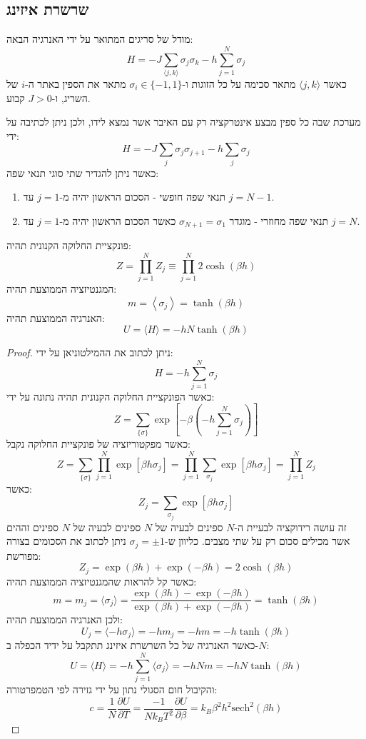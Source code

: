 \documentclass{tstextbook}
\begin{document}
\subsection{שרשרת איזינג}

\begin{reminder}
מודל של סריגים המתואר על ידי האנרגיה הבאה:
$$H=-J\sum_{\langle j,k\rangle}\sigma_{j}\sigma_{k}-h\sum_{j=1}^{N}\sigma_{j}$$
כאשר \(\langle j,k \rangle\) מתאר סכימה על כל הזוגות ו-\(\sigma_{i}\in\{ -1,1 \}\) מתאר את הספין באתר ה-\(i\) של השריג, ו-\(J>0\) קבוע.

\end{reminder}
\begin{definition}
מערכת שבה כל ספין מבצע אינטרקציה רק עם האיבר אשר נמצא לידו, ולכן ניתן לכתיבה על ידי:
$$H=-J\sum_{j}\sigma_{j}\sigma_{j+1}-h\sum_{j}\sigma_{j}$$
כאשר ניתן להגדיר שתי סוגי תנאי שפה:

  \begin{enumerate}
    \item תנאי שפה חופשי - הסכום הראשון יהיה מ-\(j=1\) עד \(j=N-1\). 


    \item תנאי שפה מחוזרי - מוגדר \(\sigma_{N+1}=\sigma_{1}\) כאשר הסכום הראשון יהיה מ-\(j=1\) עד \(j=N\). 


  \end{enumerate}
\end{definition}
\begin{proposition}[שרשרת איזינג כאשר \(J=0\)]
פונקציית החלוקה הקנונית תהיה:
$$Z=\prod_{j=1}^{N} Z_{j}\equiv \prod_{j=1}^{N}2\cosh\left( \beta h \right)$$
המגנטיזציה הממוצעת תהיה:
$$m=\left\langle  \sigma_{j}  \right\rangle =\tanh\left( \beta h \right)$$
האנרגיה הממוצעת תהיה:
$$U=\langle H\rangle=-h N\operatorname{tanh}(\beta h)$$

\end{proposition}
\begin{proof}
ניתן לכתוב את ההמילטוניאן על ידי:
$$H=-h\sum_{j=1}^{N}\sigma_{j}$$
כאשר הפונקציית החלוקה הקנונית תהיה נתונה על ידי:
$$Z=\sum_{\{\sigma\}}\exp[-\beta(-h\sum_{j=1}^{N}\sigma_{j})]$$
כאשר מפקטוריזציה של פונקציית החלוקה נקבל:
$$Z=\sum_{\{\sigma\}}\prod_{j=1}^{N}\exp[\beta h\sigma_{j}]=\prod_{j=1}^{N}\sum_{\sigma_{j}}\exp[\beta h\sigma_{j}]=\prod_{j=1}^{N}Z_{j}$$
כאשר:
$$Z_{j}=\sum_{\sigma_{j}}\exp[\beta h\sigma_{j}]$$
זה עושה רידוקציה לבעיית ה-\(N\) ספינים לבעיה של \(N\) ספינים לבעיה של \(N\) ספינים זההים אשר מכילים סכום רק על שתי מצבים. כליוון ש-\(\sigma_{j}=\pm 1\) ניתן לכתוב את הסכומים בצורה מפורשת:
$$Z_{j}=\exp(\beta h)+\exp(-\beta h)=2\cosh(\beta h)$$
כאשר קל להראות שהמגנטיזציה הממוצעת תהיה:
$$m=m_{j}=\langle\sigma_{j}\rangle={\frac{\exp(\beta h)-\exp(-\beta h)}{\exp(\beta h)+\exp(-\beta h)}}=\operatorname{tanh}(\beta h)$$
ולכן האנרגיה הממוצעת תהיה:
$$U_{j}=\langle-h\sigma_{j}\rangle=-h m_{j}=-h m=-h\operatorname{tanh}(\beta h)$$
כאשר האנרגיה של כל השרשרת איזינג תתקבל על ידיד הכפלה ב-\(N\):
$$U=\langle H\rangle=-h\sum_{j=1}^{N}\langle\sigma_{j}\rangle=-h N m=-h N\operatorname{tanh}(\beta h)$$
והקיבול חום הסגולי נתון על ידי גזירה לפי הטמפרטורה:
$$c=\frac{1}{N}\frac{\partial U}{\partial T}=\frac{-1}{N k_{B}T^{2}}\frac{\partial U}{\partial\beta}=k_{B}\beta^{2}h^{2}\mathrm{sech}^{2}(\beta h)$$

\end{proof}
\end{document}
